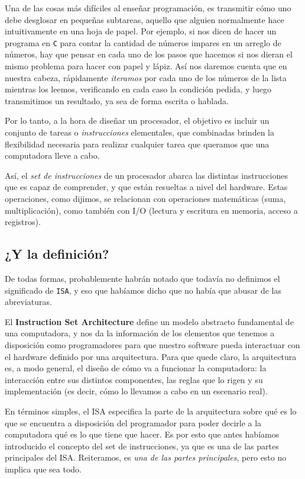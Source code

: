 \documentclass[a4paper, titlepage]{report}
\begin{document}
	Una de las cosas más difíciles al enseñar programación, es transmitir cómo uno debe desglosar en pequeñas subtareas, aquello que alguien normalmente hace intuitivamente en una hoja de papel. Por ejemplo, si nos dicen de hacer un programa en \texttt{C} para contar la cantidad de números impares en un arreglo de números, hay que pensar en cada uno de los pasos que hacemos si nos dieran el mismo problema para hacer con papel y lápiz. Así nos daremos cuenta que en nuestra cabeza, rápidamente \textit{iteramos} por cada uno de los números de la lista mientras los leemos, verificando en cada caso la condición pedida, y luego transmitimos un resultado, ya sea de forma escrita o hablada.
	
	Por lo tanto, a la hora de diseñar un procesador, el objetivo es incluir un conjunto de tareas o \textit{instrucciones} elementales, que combinadas brinden la flexibilidad necesaria para realizar cualquier tarea que queramos que una computadora lleve a cabo.
	
	Así, el \textit{set de instrucciones} de un procesador abarca las distintas instrucciones que es capaz de comprender, y que están resueltas a nivel del hardware. Estas operaciones, como dijimos, se relacionan con operaciones matemáticas (suma, multiplicación), como también con I/O (lectura y escritura en memoria, acceso a registros).
	
	\subsection{¿Y la definición?}
	
	De todas formas, probablemente habrán notado que todavía no definimos el significado de \texttt{ISA}, y eso que habíamos dicho que no había que abusar de las abreviaturas.
	
	El \textbf{Instruction Set Architecture} define un modelo abstracto fundamental de una computadora, y nos da la información de los elementos que tenemos a disposición como programadores para que nuestro software pueda interactuar con el hardware definido por una arquitectura. Para que quede claro, la arquitectura es, a modo general, el diseño de cómo va a funcionar la computadora: la interacción entre sus distintos componentes, las reglas que lo rigen y su implementación (es decir, cómo lo llevamos a cabo en un escenario real).
	
	En términos simples, el ISA especifica la parte de la arquitectura sobre qué es lo que se encuentra a disposición del programador para poder decirle a la computadora qué es lo que tiene que hacer. Es por esto que antes habíamos introducido el concepto del set de instrucciones, ya que es una de las partes principales del ISA. Reiteramos, es \textit{una de las partes principales}, pero esto no implica que sea todo.\\
	
\end{document}
